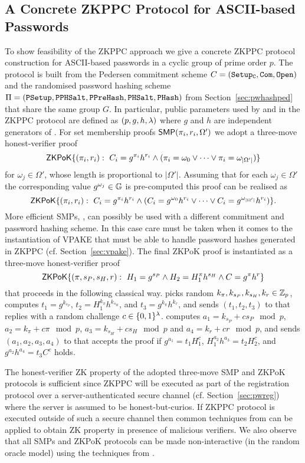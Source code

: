 \subsection{A Concrete ZKPPC Protocol for ASCII-based Passwords}\label{sec:instantiation}
To show feasibility of the \ac{ZKPPC} approach we give a concrete \ac{ZKPPC} protocol construction for \ac{ASCII}-based passwords in a cyclic group \GG of prime order $p$. 
The protocol is built from the Pedersen commitment scheme $C=(\mathtt{Setup_C},\mathtt{Com},\mathtt{Open})$ and the randomised password hashing scheme $\Pi=(\mathtt{PSetup},\allowbreak\mathtt{PPHSalt},\allowbreak\mathtt{PPreHash},\mathtt{PHSalt},\allowbreak\mathtt{PHash})$ from Section~\ref{sec:pwhashped} that share the same group $G$. 
In particular, public parameters used by \Client and \Server in the \ac{ZKPPC} protocol are defined as $(p,g,h,\lambda)$ where $g$ and $h$ are independent generators of \GG. 
For set membership proofs $\mathsf{SMP}(\pi_i,r_i,\Omega')$ we adopt a three-move honest-verifier proof 
\[\mathsf{ZKPoK}\{(\pi_i,r_i):~ C_i=g^{\pi_i}h^{r_i} \wedge (\pi_i=\omega_0 \vee \dots \vee \pi_i=\omega_{|\Omega'|})\}\]
for $\omega_j\in\Omega'$, whose length is proportional to $|\Omega'|$. 
Assuming that for each $\omega_j\in\Omega'$ the corresponding value $g^{\omega_j}\in \mathbb{G}$ is pre-computed this proof can be realised as 
\[\mathsf{ZKPoK}\{(\pi_i,r_i):~ C_i=g^{\pi_i}h^{r_i} \wedge (C_i=g^{\omega_0}h^{r_i} \vee \dots \vee C_i=g^{\omega_{|\Omega'|}}h^{r_i})\}.\]
More efficient SMPs, \eg \cite{CamenischCS08}, can possibly be used with a different commitment and password hashing scheme. 
In this case care must be taken when it comes to the instantiation of \ac{VPAKE} that must be able to handle password hashes generated in \ac{ZKPPC} (cf. Section~\ref{sec:vpake}).
The final \ac{ZKPoK} proof is instantiated as a three-move honest-verifier proof 
\[\mathsf{ZKPoK}\{(\pi, s_P, s_H, r):~ H_1=g^{s_P} \wedge H_2 = H_1^{\pi}h^{s_H} \wedge C = g^\pi h^{r}\}\] 
that proceeds in the following classical way. 
\Client picks random $k_\pi, k_{s_P}, k_{s_H}, k_{r}\in\mathbb{Z}_p$, computes $t_1=g^{k_{s_P}}$, $t_2=H_1^{k_\pi}h^{k_{s_H}}$, and $t_3=g^{k_\pi}h^{k_{r}}$, and sends $(t_1,t_2,t_3)$ to \Server that replies with a random challenge $c\in\{0,1\}^\lambda$. 
\Client computes $a_1=k_{s_P}+cs_P\mod p$, $a_2=k_\pi+c\pi \mod p$, $a_3=k_{s_H}+cs_{H}\mod p$ and $a_4=k_{r}+cr\mod p$, and sends $(a_1,a_2,a_3,a_4)$ to \Server that accepts the proof if $g^{a_1}=t_1 H_1^{c}$, $H_1^{a_2}h^{a_3}=t_2H_2^c$, and $g^{a_2}h^{a_4}=t_3C^c$ holds.

\begin{remark}
The honest-verifier \ac{ZK} property of the adopted three-move \ac{SMP} and \ac{ZKPoK} protocols is sufficient since \ac{ZKPPC} will be executed as part of the registration protocol over a server-authenticated secure channel (cf. Section~\ref{sec:pwreg}) where the server is assumed to be honest-but-curios. 
If \ac{ZKPPC} protocol is executed outside of such a secure channel then common techniques from \citet{CramerDM00} can be applied to obtain \ac{ZK} property in presence of malicious verifiers. 
We also observe that all \acp{SMP} and \ac{ZKPoK} protocols can be made non-interactive (in the random oracle model) using the techniques from \citet{FiatS86}.
\end{remark}


